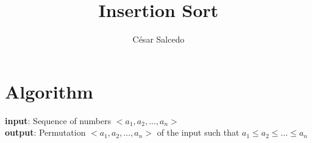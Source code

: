 \documentclass[11pt, oneside]{article}   	%
\title{Insertion Sort}
\author{C\'{e}sar Salcedo}
\begin{document}
\maketitle
\section{Algorithm}


\textbf{input}: Sequence of numbers $<a_1, a_2, ..., a_n>$\\
\textbf{output}: Permutation $<a_1, a_2, ..., a_n>$ of the input such that $a_1\leq a_2 \leq ... \leq a_n$
\end{document}
